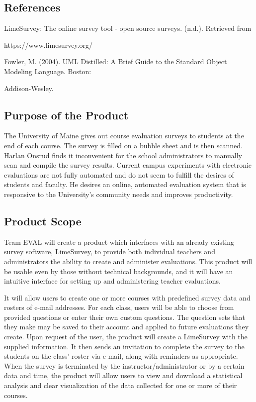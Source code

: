 \documentclass{article}
\begin{document}
\subsection{References}

LimeSurvey: The online survey tool - open source surveys. (n.d.). Retrieved from

https://www.limesurvey.org/

\medskip \noindent
Fowler, M. (2004). UML Distilled: A Brief Guide to the Standard Object Modeling Language. Boston:

Addison-Wesley.

\subsection{Purpose of the Product}

The University of Maine gives out course evaluation surveys to students at the end of each course. The survey is filled on a bubble sheet and is then scanned. Harlan Onsrud finds it inconvenient for the school administrators to manually scan and compile the survey results. Current campus experiments with electronic evaluations are not fully automated and do not seem to fulfill the desires of students and faculty. He desires an online, automated evaluation system that is responsive to the University's community needs and improves productivity.\par

\subsection{Product Scope}

Team EVAL will create a product which interfaces with an already existing survey software, LimeSurvey, to provide both individual teachers and administrators the ability to create and administer evaluations.  This product will be usable even by those without technical backgrounds, and it will have an intuitive interface for setting up and administering teacher evaluations.

It will allow users to create one or more courses with predefined survey data and rosters of e-mail addresses.  For each class, users will be able to choose from provided questions or enter their own custom questions.  The question sets that they make may be saved to their account and applied to future evaluations they create.  Upon request of the user, the product will create a LimeSurvey with the supplied information. It then sends an invitation to complete the survey to the students on the class' roster via e-mail, along with reminders as appropriate.  When the survey is terminated by the instructor/administrator or by a certain data and time, the product will allow users to view and download a statistical analysis and clear visualization of the data collected for one or more of their courses.
\end{document}
